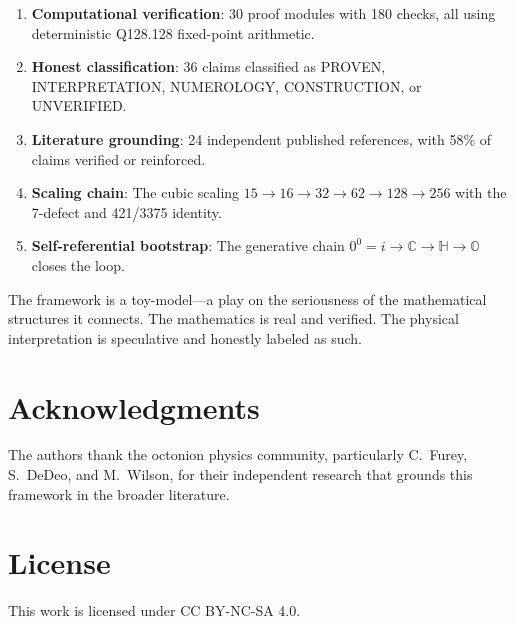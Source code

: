 \documentclass[11pt]{article}
\begin{document}
\begin{enumerate}
\item \textbf{Computational verification}: 30 proof modules with 180 checks, all using deterministic Q128.128 fixed-point arithmetic.
\item \textbf{Honest classification}: 36 claims classified as PROVEN, INTERPRETATION, NUMEROLOGY, CONSTRUCTION, or UNVERIFIED.
\item \textbf{Literature grounding}: 24 independent published references, with 58\% of claims verified or reinforced.
\item \textbf{Scaling chain}: The cubic scaling $15 \to 16 \to 32 \to 62 \to 128 \to 256$ with the 7-defect and 421/3375 identity.
\item \textbf{Self-referential bootstrap}: The generative chain $0^0 = i \to \mathbb{C} \to \mathbb{H} \to \mathbb{O}$ closes the loop.
\end{enumerate}

The framework is a toy-model---a play on the seriousness of the mathematical structures it connects. The mathematics is real and verified. The physical interpretation is speculative and honestly labeled as such.

\section*{Acknowledgments}

The authors thank the octonion physics community, particularly C.\ Furey, S.\ DeDeo, and M.\ Wilson, for their independent research that grounds this framework in the broader literature.

\section*{License}

This work is licensed under CC BY-NC-SA 4.0.



\end{document}
